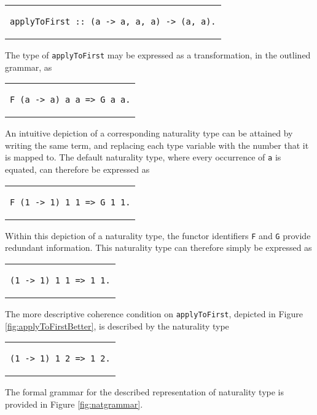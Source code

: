 \documentclass[../Dissertation.tex]{subfiles}
\begin{document}
\begin{center}
\begin{tabular}{c}
\begin{lstlisting}
applyToFirst :: (a -> a, a, a) -> (a, a).
\end{lstlisting}
\end{tabular}
\end{center}
The type of \lstinline{applyToFirst} may be expressed as a transformation, in the outlined grammar, as 
\begin{center}
\begin{tabular}{c}
\begin{lstlisting}
F (a -> a) a a => G a a.
\end{lstlisting}
\end{tabular}
\end{center}
An intuitive depiction of a corresponding naturality type can be attained by writing the same term, and replacing each type variable with the number that it is mapped to. The default naturality type, where every occurrence of \lstinline{a} is equated, can therefore be expressed as 
\begin{center}
\begin{tabular}{c}
\begin{lstlisting}
F (1 -> 1) 1 1 => G 1 1.
\end{lstlisting}
\end{tabular}
\end{center}
Within this depiction of a naturality type, the functor identifiers \lstinline{F} and \lstinline{G} provide redundant information. This naturality type can therefore simply be expressed as
\begin{center}
\begin{tabular}{c}
\begin{lstlisting}
(1 -> 1) 1 1 => 1 1.
\end{lstlisting}
\end{tabular}
\end{center}
The more descriptive coherence condition on \lstinline{applyToFirst}, depicted in Figure \ref{fig:applyToFirstBetter}, is described by the naturality type
\begin{center}
\begin{tabular}{c}
\begin{lstlisting}
(1 -> 1) 1 2 => 1 2.
\end{lstlisting}
\end{tabular}
\end{center}
\par
The formal grammar for the described representation of naturality type is provided in Figure \ref{fig:natgrammar}.
\end{document}
